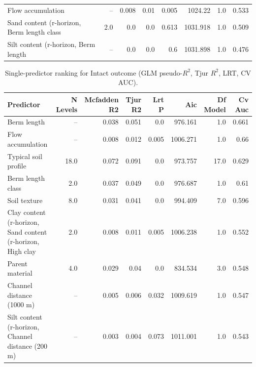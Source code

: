 \documentclass[11pt, a4paper]{article}
\begin{document}
\begin{table}[H]
\begin{tabular}{lrrrrrrr}
    Flow accumulation & -- & 0.008 & 0.01 & 0.005 & 1024.22 & 1.0 & 0.533 \\
    Sand content (r-horizon, %
    Berm length class & 2.0 & 0.0 & 0.0 & 0.613 & 1031.918 & 1.0 & 0.509 \\
    Silt content (r-horizon, %
    Berm length & -- & 0.0 & 0.0 & 0.6 & 1031.898 & 1.0 & 0.476 \\
    \bottomrule
  \end{tabular}
\end{table}

\vspace{2em}

\begin{table}[H]
  \centering
  \caption{Single-predictor ranking for Intact outcome (GLM pseudo-$R^2$, Tjur $R^2$, LRT, CV AUC).}
  \label{tab:si_ranked_intact}
  \small
  \begin{tabular}{lrrrrrrr}
    \toprule
    Predictor & N Levels & Mcfadden R2 & Tjur R2 & Lrt P & Aic & Df Model & Cv Auc \\
    \midrule
    Berm length & -- & 0.038 & 0.051 & 0.0 & 976.161 & 1.0 & 0.661 \\
    Flow accumulation & -- & 0.008 & 0.012 & 0.005 & 1006.271 & 1.0 & 0.66 \\
    Typical soil profile & 18.0 & 0.072 & 0.091 & 0.0 & 973.757 & 17.0 & 0.629 \\
    Berm length class & 2.0 & 0.037 & 0.049 & 0.0 & 976.687 & 1.0 & 0.61 \\
    Soil texture & 8.0 & 0.031 & 0.041 & 0.0 & 994.409 & 7.0 & 0.596 \\
    Clay content (r-horizon, %
    Sand content (r-horizon, %
    High clay & 2.0 & 0.008 & 0.011 & 0.005 & 1006.238 & 1.0 & 0.552 \\
    Parent material & 4.0 & 0.029 & 0.04 & 0.0 & 834.534 & 3.0 & 0.548 \\
    Channel distance (1000 m) & -- & 0.005 & 0.006 & 0.032 & 1009.619 & 1.0 & 0.547 \\
    Silt content (r-horizon, %
    Channel distance (200 m) & -- & 0.003 & 0.004 & 0.073 & 1011.001 & 1.0 & 0.543 \\

\end{tabular}
\end{table}
\end{document}
